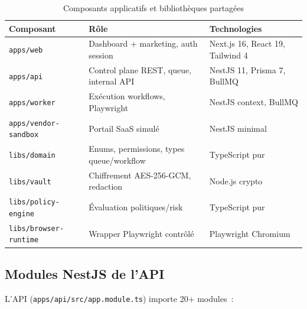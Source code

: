 \begin{table}[H]
\centering
\caption{Composants applicatifs et bibliothèques partagées}
\label{tab:composants}
\begin{tabularx}{\textwidth}{@{}p{2.8cm}Xp{4.2cm}@{}}
\toprule
\textbf{Composant}   & \textbf{Rôle}                              & \textbf{Technologies} \\
\midrule
\rowcolor{rowgray}
\texttt{apps/web}    & Dashboard + marketing, auth session        & Next.js 16, React 19, Tailwind 4 \\
\texttt{apps/api}    & Control plane REST, queue, internal API    & NestJS 11, Prisma 7, BullMQ \\
\rowcolor{rowgray}
\texttt{apps/worker} & Exécution workflows, Playwright            & NestJS context, BullMQ \\
\texttt{apps/vendor-sandbox} & Portail SaaS simulé                 & NestJS minimal \\
\rowcolor{rowgray}
\texttt{libs/domain} & Enums, permissions, types queue/workflow   & TypeScript pur \\
\texttt{libs/vault}  & Chiffrement AES-256-GCM, redaction         & Node.js crypto \\
\rowcolor{rowgray}
\texttt{libs/policy-engine} & Évaluation politiques/risk          & TypeScript pur \\
\texttt{libs/browser-runtime} & Wrapper Playwright contrôlé       & Playwright Chromium \\
\bottomrule
\end{tabularx}
\end{table}

\subsection{Modules NestJS de l'API}

L'API (\texttt{apps/api/src/app.module.ts}) importe 20+ modules~:

